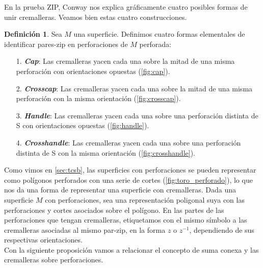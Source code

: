 \documentclass[10pt]{report}
\newcommand{\enfatiza}[1]{\textbf{\textit{#1}}}
\theoremstyle{definition}
\newtheorem{defin}{Definición}[section]
\begin{document}
En la prueba ZIP, Conway nos explica gráficamente cuatro posibles formas de unir cremalleras. Veamos bien estas cuatro construcciones.\\


\begin{defin}
Sea $M$ una superficie. Definimos cuatro formas elementales de identificar pares-zip en perforaciones de 
$M$ perforada:

\begin{itemize}
\item[1.] \enfatiza{Cap}: Las cremalleras yacen cada una sobre la mitad de una misma perforación con orientaciones opuestas (\autoref{fig:cap}).
\item[2.] \enfatiza{Crosscap}: Las cremalleras yacen cada una sobre la mitad de una misma perforación con la misma orientación (\autoref{fig:crosscap}).
\item[3.] \enfatiza{Handle}: Las cremalleras yacen cada una sobre una perforación distinta de S con orientaciones opuestas (\autoref{fig:handle}).
\item[4.] \enfatiza{Crosshandle}: Las cremalleras yacen cada una sobre una perforación distinta de S con la misma orientación (\autoref{fig:crosshandle}).
\end{itemize}
\end{defin}

Como vimos en \autoref{sec:tcsb}, las superficies con perforaciones se pueden representar como polígonos perforados con una serie de cortes (\autoref{fig:toro_perforado}), lo que nos da una forma de representar una superficie con cremalleras. Dada una superficie $M$ con perforaciones, sea una representación poligonal suya con las perforaciones y cortes asociados sobre el polígono. En las partes de las perforaciones que tengan cremalleras, etiquetamos con el mismo símbolo a las cremalleras asociadas al mismo par-zip, en la forma $z$ o $z^{-1}$, dependiendo de sus respectivas orientaciones. \\

Con la siguiente proposición vamos a relacionar el concepto de suma conexa y las cremalleras sobre perforaciones.
\end{document}
